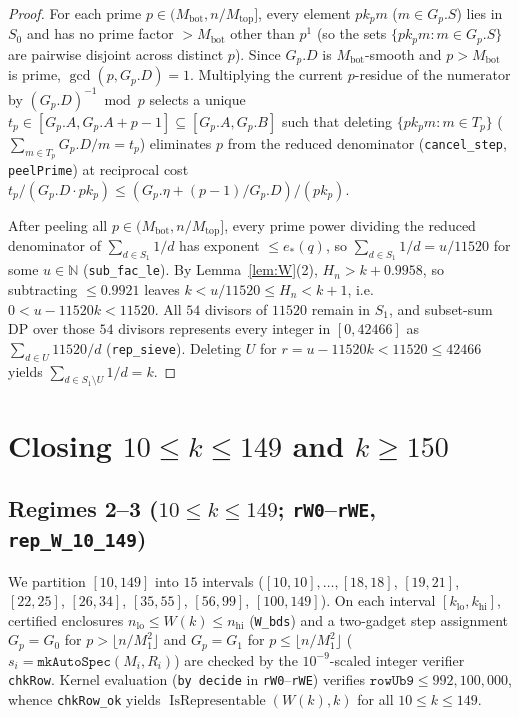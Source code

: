 \documentclass[11pt,a4paper]{amsart}
\theoremstyle{remark}
\newcommand{\Rep}{\operatorname{IsRepresentable}}
\begin{document}
\begin{proof}
For each prime $p \in (M_{\mathrm{bot}}, n / M_{\mathrm{top}}]$, every element $p k_p m$ ($m \in G_p.S$) lies in $S_0$ and has no prime factor $> M_{\mathrm{bot}}$ other than $p^1$ (so the sets $\{p k_p m : m \in G_p.S\}$ are pairwise disjoint across distinct $p$). Since $G_p.D$ is $M_{\mathrm{bot}}$-smooth and $p > M_{\mathrm{bot}}$ is prime, $\gcd(p, G_p.D) = 1$. Multiplying the current $p$-residue of the numerator by $(G_p.D)^{-1} \bmod p$ selects a unique $t_p \in [G_p.A, G_p.A + p - 1] \subseteq [G_p.A, G_p.B]$ such that deleting $\{p k_p m : m \in T_p\}$ ($\sum_{m \in T_p} G_p.D / m = t_p$) eliminates $p$ from the reduced denominator (\texttt{cancel\_step}, \texttt{peelPrime}) at reciprocal cost $t_p / (G_p.D \cdot p k_p) \le (G_p.\eta + (p - 1)/G_p.D)/(p k_p)$.

After peeling all $p \in (M_{\mathrm{bot}}, n / M_{\mathrm{top}}]$, every prime power dividing the reduced denominator of $\sum_{d \in S_1} 1/d$ has exponent $\le e_*(q)$, so $\sum_{d \in S_1} 1/d = u / 11520$ for some $u \in \mathbb{N}$ (\texttt{sub\_fac\_le}). By Lemma~\ref{lem:W}(2), $H_n > k + 0.9958$, so subtracting $\le 0.9921$ leaves $k < u / 11520 \le H_n < k + 1$, i.e.\ $0 < u - 11520 k < 11520$. All $54$ divisors of $11520$ remain in $S_1$, and subset-sum DP over those $54$ divisors represents every integer in $[0, 42466]$ as $\sum_{d \in U} 11520 / d$ (\texttt{rep\_sieve}). Deleting $U$ for $r = u - 11520 k < 11520 \le 42466$ yields $\sum_{d \in S_1 \setminus U} 1/d = k$.
\end{proof}

\section{\texorpdfstring{Closing $10 \le k \le 149$ and $k \ge 150$}{Closing 10 <= k <= 149 and k >= 150}}

\subsection*{\texorpdfstring{Regimes 2--3 ($10 \le k \le 149$; \texttt{rW0}--\texttt{rWE}, \texttt{rep\_W\_10\_149})}{Regimes 2-3 (10 <= k <= 149)}}
We partition $[10, 149]$ into $15$ intervals ($[10, 10], \dots, [18, 18]$, $[19, 21]$, $[22, 25]$, $[26, 34]$, $[35, 55]$, $[56, 99]$, $[100, 149]$). On each interval $[k_{\mathrm{lo}}, k_{\mathrm{hi}}]$, certified enclosures $n_{\mathrm{lo}} \le W(k) \le n_{\mathrm{hi}}$ (\texttt{W\_bds}) and a two-gadget step assignment $G_p = G_0$ for $p > \lfloor n / M_1^2 \rfloor$ and $G_p = G_1$ for $p \le \lfloor n / M_1^2 \rfloor$ ($s_i = \texttt{mkAutoSpec}(M_i, R_i)$) are checked by the $10^{-9}$-scaled integer verifier \texttt{chkRow}. Kernel evaluation (\texttt{by decide} in \texttt{rW0}--\texttt{rWE}) verifies $\texttt{rowUb9} \le 992{,}100{,}000$, whence \texttt{chkRow\_ok} yields $\Rep(W(k), k)$ for all $10 \le k \le 149$.
\end{document}
